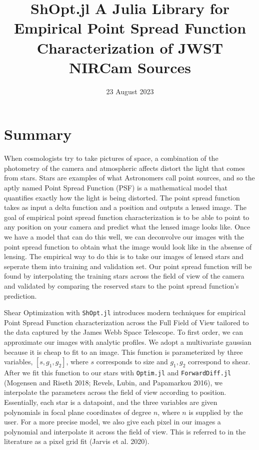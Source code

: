 \documentclass[
]{article}
\title{ShOpt.jl \textbar{} A Julia Library for Empirical Point Spread
Function Characterization of JWST NIRCam Sources}
\author{}
\date{23 August 2023}
\begin{document}
\maketitle

\hypertarget{summary}{%
\section{Summary}\label{summary}}

When cosmologists try to take pictures of space, a combination of the
photometry of the camera and atmospheric affects distort the light that
comes from stars. Stars are examples of what Astronomers call point
sources, and so the aptly named Point Spread Function (PSF) is a
mathematical model that quantifies exactly how the light is being
distorted. The point spread function takes as input a delta function and
a position and outputs a lensed image. The goal of empirical point
spread function characterization is to be able to point to any position
on your camera and predict what the lensed image looks like. Once we
have a model that can do this well, we can deconvolve our images with
the point spread function to obtain what the image would look like in
the absense of lensing. The empirical way to do this is to take our
images of lensed stars and seperate them into training and validation
set. Our point spread function will be found by interpolating the
training stars across the field of view of the camera and validated by
comparing the reserved stars to the point spread function's prediction.

Shear Optimization with \texttt{ShOpt.jl} introduces modern techniques
for empirical Point Spread Function characterization across the Full
Field of View tailored to the data captured by the James Webb Space
Telescope. To first order, we can approximate our images with analytic
profiles. We adopt a multivariate gaussian because it is cheap to fit to
an image. This function is parameterized by three variables,
\([s, g_1, g_2]\), where \(s\) corresponds to size and \(g_1 , g_2\)
correspond to shear. After we fit this function to our stars with
\texttt{Optim.jl} and \texttt{ForwardDiff.jl} (Mogensen and Riseth 2018;
Revels, Lubin, and Papamarkou 2016), we interpolate the parameters
across the field of view according to position. Essentially, each star
is a datapoint, and the three variables are given polynomials in focal
plane coordinates of degree \(n\), where \(n\) is supplied by the user.
For a more precise model, we also give each pixel in our images a
polynomial and interpolate it across the field of view. This is referred
to in the literature as a pixel grid fit (Jarvis et al. 2020).
\end{document}
